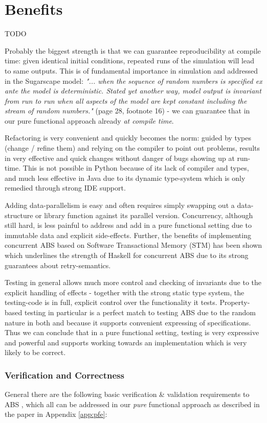 \chapter{Benefits}
TODO

Probably the biggest strength is that we can guarantee reproducibility at compile time: given identical initial conditions, repeated runs of the simulation will lead to same outputs. This is of fundamental importance in simulation and addressed in the Sugarscape model: \textit{"... when the sequence of random numbers is specified ex ante the model is deterministic. Stated yet another way, model output is invariant from run to run when all aspects of the model are kept constant including the stream of random numbers."} (page 28, footnote 16) - we can guarantee that in our pure functional approach already \textit{at compile time}.

Refactoring is very convenient and quickly becomes the norm: guided by types (change / refine them) and relying on the compiler to point out problems, results in very effective and quick changes without danger of bugs showing up at run-time. This is not possible in Python because of its lack of compiler and types, and much less effective in Java due to its dynamic type-system which is only remedied through strong IDE support.

Adding data-parallelism is easy and often requires simply swapping out a data-structure or library function against its parallel version. Concurrency, although still hard, is less painful to address and add in a pure functional setting due to immutable data and explicit side-effects. Further, the benefits of implementing concurrent ABS based on Software Transactional Memory (STM) has been shown \cite{thaler_tale_2018} which underlines the strength of Haskell for concurrent ABS due to its strong guarantees about retry-semantics.

Testing in general allows much more control and checking of invariants due to the explicit handling of effects - together with the strong static type system, the testing-code is in full, explicit control over the functionality it tests. Property-based testing in particular is a perfect match to testing ABS due to the random nature in both and because it supports convenient expressing of specifications. Thus we can conclude that in a pure functional setting, testing is very expressive and powerful and supports working towards an implementation which is very likely to be correct.


\subsection{Verification and Correctness}
General there are the following basic verification \& validation requirements to ABS \cite{robinson_simulation:_2014}, which all can be addressed in our \textit{pure} functional approach as described in the paper in Appendix \ref{app:pfe}:

